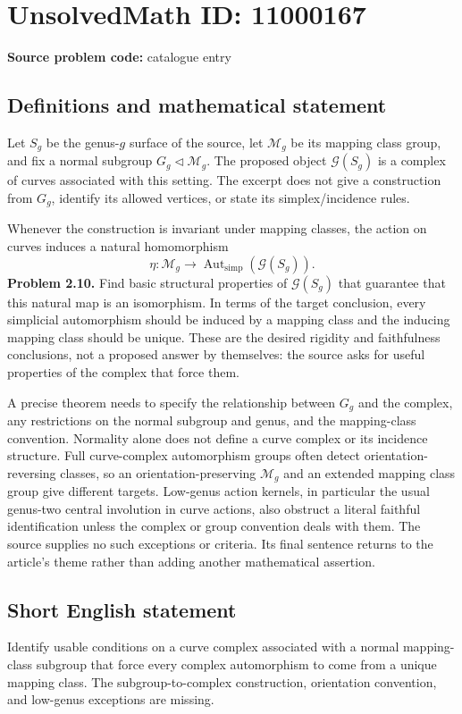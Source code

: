 \documentclass[11pt]{article}
\begin{document}
\section*{UnsolvedMath ID: 11000167}
\textbf{Source problem code:} catalogue entry
\subsection{Definitions and mathematical statement}
Let $S_g$ be the genus-$g$ surface of the source, let $\mathcal M_g$ be its mapping class group, and fix a normal subgroup $G_g\triangleleft\mathcal M_g$. The proposed object $\mathcal G(S_g)$ is a complex of curves associated with this setting. The excerpt does not give a construction from $G_g$, identify its allowed vertices, or state its simplex/incidence rules.

Whenever the construction is invariant under mapping classes, the action on curves induces a natural homomorphism
\[
 \eta:\mathcal M_g\longrightarrow\operatorname{Aut}_{\mathrm{simp}}(\mathcal G(S_g)).
\]
\textbf{Problem 2.10.} Find basic structural properties of $\mathcal G(S_g)$ that guarantee that this natural map is an isomorphism. In terms of the target conclusion, every simplicial automorphism should be induced by a mapping class and the inducing mapping class should be unique. These are the desired rigidity and faithfulness conclusions, not a proposed answer by themselves: the source asks for useful properties of the complex that force them.

A precise theorem needs to specify the relationship between $G_g$ and the complex, any restrictions on the normal subgroup and genus, and the mapping-class convention. Normality alone does not define a curve complex or its incidence structure. Full curve-complex automorphism groups often detect orientation-reversing classes, so an orientation-preserving $\mathcal M_g$ and an extended mapping class group give different targets. Low-genus action kernels, in particular the usual genus-two central involution in curve actions, also obstruct a literal faithful identification unless the complex or group convention deals with them. The source supplies no such exceptions or criteria. Its final sentence returns to the article's theme rather than adding another mathematical assertion.
\subsection{Short English statement}
Identify usable conditions on a curve complex associated with a normal mapping-class subgroup that force every complex automorphism to come from a unique mapping class. The subgroup-to-complex construction, orientation convention, and low-genus exceptions are missing.
\end{document}
